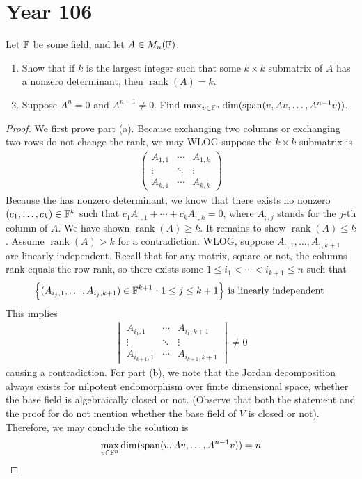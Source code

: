 \documentclass{report}
\begin{document}
\section{Year 106}
\begin{question}{}{}
Let $\mathbb{F}$ be some field, and let $A\in M_n(\mathbb{F})$.
\begin{enumerate}[label=(\alph*)]
  \item Show that if $k$ is the largest integer such that some $k\times k$ submatrix of $A$ has a nonzero determinant, then $\operatorname{rank}(A)=k$. 
  \item Suppose $A^n=0$ and $A^{n-1}\neq 0$. Find $\max_{v \in \mathbb{F}^n} \operatorname{dim}(\operatorname{span}(v,Av,\dots ,A^{n-1}v))$. 
\end{enumerate}
\end{question}
\begin{proof}
We first prove part (a). Because exchanging two columns or exchanging two rows do not change the rank, we may WLOG suppose the $k\times k$ submatrix is 
 \begin{align}
\label{Ask}
\begin{pmatrix} 
  A_{1,1} & \cdots & A_{1,k} \\
  \vdots & \ddots & \vdots \\
  A_{k,1} & \cdots & A_{k,k}
\end{pmatrix}
\end{align}
Because the  has nonzero determinant, we know that there exists no nonzero $(c_1,\dots ,c_k)\in \mathbb{F}^k$ such that $c_1A_{;,1}+\cdots + c_k A_{;,k}=0$, where  $A_{;,j}$ stands for the $j$-th column of  $A$. We have shown  $\operatorname{rank}(A)\geq k$. It remains to show $\operatorname{rank}(A)\leq k$. Assume $\operatorname{rank}(A)>k$ for a contradiction. WLOG, suppose $A_{;,1},\dots ,A_{;,k+1}$ are linearly independent. Recall that for any matrix, square or not, the columns rank equals the row rank, so there exists some $1\leq i_1< \cdots < i_{k+1} \leq  n$ such that 
\begin{align*}
 \Big\{ (A_{i_j,1},\dots ,A_{i_j,k+1})\in \mathbb{F}^{k+1}: 1\leq j \leq k+1 \Big\}\text{ is linearly independent }
\end{align*}
This implies 
\begin{align*}
\begin{vmatrix} 
  A_{i_1,1} & \cdots & A_{i_1,k+1} \\
  \vdots & \ddots & \vdots \\
  A_{i_{k+1},1} & \cdots & A_{i_{k+1},k+1}
\end{vmatrix}\neq 0
\end{align*}
causing a contradiction. For part (b), we note that the Jordan decomposition always exists for nilpotent endomorphism over finite dimensional space, whether the base field is algebraically closed or not. (Observe that both the statement and the proof for  do not mention whether the base field of $V$ is closed or not). Therefore, we may conclude the solution is  
\begin{align*}
\max_{v \in \mathbb{F}^n} \operatorname{dim}(\operatorname{span}(v,Av,\dots ,A^{n-1}v))=n  
\end{align*}
\end{proof}
\end{document}
